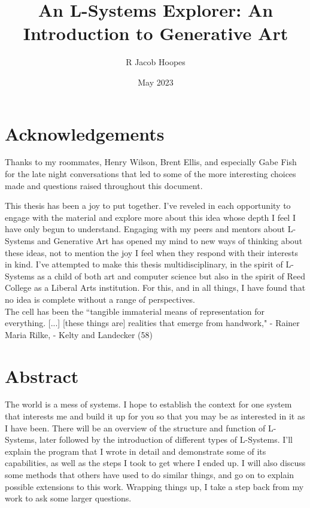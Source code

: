\documentclass[12pt,twoside]{reedthesis}
\title{An L-Systems Explorer: An Introduction to Generative Art} %
\author{R Jacob Hoopes}
\date{May 2023}
\begin{document}
  \maketitle
  \frontmatter %
  \pagestyle{empty} %

    \chapter*{Acknowledgements}
	Thanks to my roommates, Henry Wilson, Brent Ellis, and especially Gabe Fish for the late night conversations that led to some of the more interesting choices made and questions raised throughout this document.
	
	This thesis has been a joy to put together. I've reveled in each opportunity to engage with the material and explore more about this idea whose depth I feel I have only begun to understand. Engaging with my peers and mentors about L-Systems and Generative Art has opened my mind to new ways of thinking about these ideas, not to mention the joy I feel when they respond with their interests in kind. I've attempted to make this thesis multidisciplinary, in the spirit of L-Systems as a child of both art and computer science but also in the spirit of Reed College as a Liberal Arts institution. For this, and in all things, I have found that no idea is complete without a range of perspectives.\\
	
	The cell has been the ``tangible immaterial means of representation for everything. [...] [these things are] realities that emerge from handwork," - Rainer Maria Rilke, - Kelty and Landecker (58)


    \tableofcontents

\chapter*{Abstract}
	The world is a mess of systems. I hope to establish the context for one system that interests me and build it up for you so that you may be as interested in it as I have been. There will be an overview of the structure and function of L-Systems, later followed by the introduction of different types of L-Systems. I'll explain the program that I wrote in detail and demonstrate some of its capabilities, as well as the steps I took to get where I ended up. I will also discuss some methods that others have used to do similar things, and go on to explain possible extensions to this work. Wrapping things up, I take a step back from my work to ask some larger questions.
	
\end{document}
